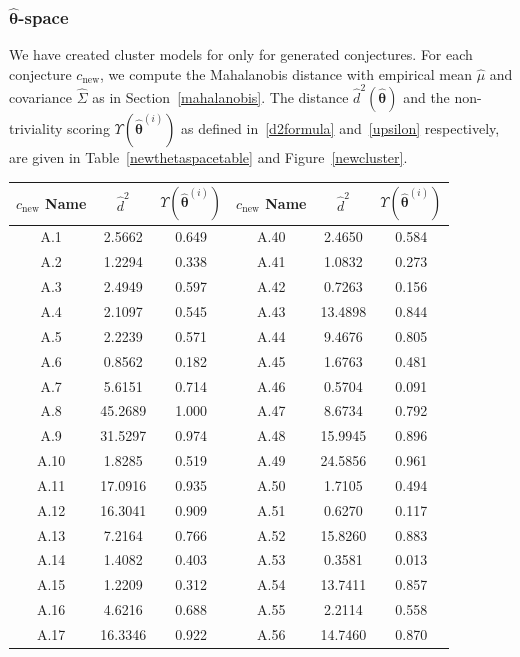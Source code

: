 \documentclass[11pt,reqno]{amsart}
\theoremstyle{plain}\newtheorem{theorem}{Theorem}[section]
\numberwithin{equation}{section}
\begin{document}
\subsubsection{$\bm{\hat{\theta}}$-space}

We have created cluster models for only for generated conjectures. For each conjecture $c_{\mathrm{new}}$, we compute the Mahalanobis distance with empirical mean $\hat{\mu}$ and covariance $\hat{\Sigma}$ as in Section~\ref{mahalanobis}. The distance $\hat{d}^2(\bm{\hat{\theta}})$ and the non-triviality scoring $\Upsilon(\bm{\hat{\theta}}^{(i)})$ as defined in~\eqref{d2formula} and~\eqref{upsilon} respectively, are given in Table~\ref{newthetaspacetable} and Figure~\ref{newcluster}.


\begin{table}[ht]
\centering
\begin{tabular}{|c|c|c||c|c|c|}
\hline
$c_{\mathrm{new}}$ Name & $\hat{d}^2$ & $\Upsilon(\bm{\hat{\theta}}^{(i)})$ &$c_{\mathrm{new}}$ Name & $\hat{d}^2$ & $\Upsilon(\bm{\hat{\theta}}^{(i)})$ \\
\hline
A.1  & 2.5662  & 0.649 & A.40 & 2.4650  & 0.584 \\
A.2  & 1.2294  & 0.338 & A.41 & 1.0832  & 0.273 \\
A.3  & 2.4949  & 0.597 & A.42 & 0.7263  & 0.156 \\
A.4  & 2.1097  & 0.545 & A.43 & 13.4898 & 0.844 \\
A.5  & 2.2239  & 0.571 & A.44 & 9.4676  & 0.805 \\
A.6  & 0.8562  & 0.182 & A.45 & 1.6763  & 0.481 \\
A.7  & 5.6151  & 0.714 & A.46 & 0.5704  & 0.091 \\
A.8  & 45.2689 & 1.000 & A.47 & 8.6734  & 0.792 \\
A.9  & 31.5297 & 0.974 & A.48 & 15.9945 & 0.896 \\
A.10 & 1.8285  & 0.519 & A.49 & 24.5856 & 0.961 \\
A.11 & 17.0916 & 0.935 & A.50 & 1.7105  & 0.494 \\
A.12 & 16.3041 & 0.909 & A.51 & 0.6270  & 0.117 \\
A.13 & 7.2164  & 0.766 & A.52 & 15.8260 & 0.883 \\
A.14 & 1.4082  & 0.403 & A.53 & 0.3581  & 0.013 \\
A.15 & 1.2209  & 0.312 & A.54 & 13.7411 & 0.857 \\
A.16 & 4.6216  & 0.688 & A.55 & 2.2114  & 0.558 \\
A.17 & 16.3346 & 0.922 & A.56 & 14.7460 & 0.870 \\

\end{tabular}
\end{table}
\end{document}
